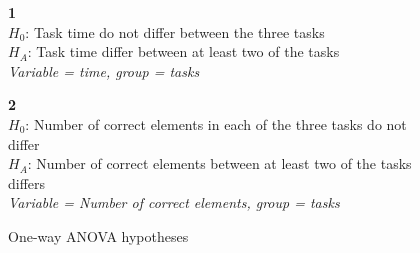 \begin{figure}[H]
	\begin{framed}\centering
		\textbf{1}\\
		$H_{0}$: Task time do not differ between the three tasks\\
		$H_{A}$: Task time differ between at least two of the tasks\\
		\textit{Variable = time, group = tasks}\newline
		
		\textbf{2}\\
		$H_{0}$: Number of correct elements in each of the three tasks do not differ\\
		$H_{A}$: Number of correct elements between at least two of the tasks differs \\
		\textit{Variable = Number of correct elements, group = tasks}
		
	\end{framed}
	\caption{One-way ANOVA hypotheses}
	\label{fig:hypothesis_anova}
\end{figure}




